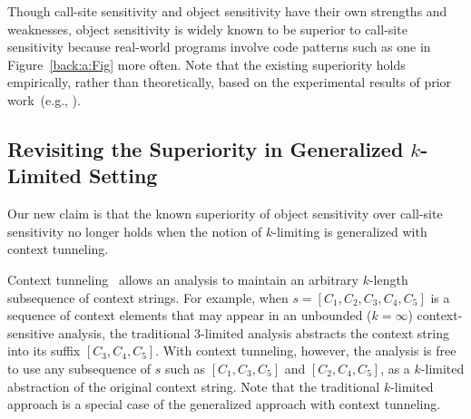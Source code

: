  Though call-site sensitivity and object sensitivity have their own
 strengths and weaknesses, object
  sensitivity is widely known to be superior to call-site sensitivity 
  because real-world programs involve code patterns such as one in
  Figure~\ref{back:a:Fig} more often. 
  Note that the existing superiority holds empirically, rather than theoretically, based on the experimental results of prior work~(e.g., \cite{Lhotak2008,BravenboerS09}).  
  



\subsection{Revisiting the Superiority in Generalized $k$-Limited Setting}\label{sec:overview-result}
Our new claim is that the known superiority of object sensitivity over call-site sensitivity no longer holds when the notion of $k$-limiting is generalized with context tunneling. 


Context tunneling~\cite{JeJeOh18} allows an analysis to maintain an arbitrary $k$-length subsequence of context strings.
For example, when $s = [C_1, C_2, C_3, C_4, C_5]$ is a sequence of
context elements that may appear in an unbounded ($k=\infty$)
context-sensitive analysis, the traditional $3$-limited analysis
abstracts the context string into its suffix $[C_3,C_4,C_5]$. 
With context tunneling, however, the analysis is free to use any
subsequence of $s$ such as $[C_1, C_3, C_5]$ and $[C_2, C_4, C_5]$, as
a $k$-limited abstraction of the original context string. 
Note that the traditional $k$-limited approach is a special case of the
generalized approach with context tunneling. 


